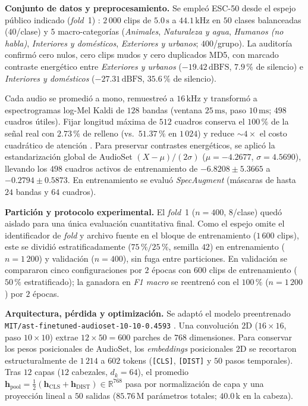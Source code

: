 \documentclass[letterpaper, 10 pt, conference]{ieeeconf}
\begin{document}
\textbf{Conjunto de datos y preprocesamiento.}
Se empleó ESC-50 \cite{c1} desde el espejo público indicado (\textit{fold}~1) \cite{c6}: $2\,000$ clips de $5.0\,\text{s}$ a $44.1\,\text{kHz}$ en $50$ clases balanceadas ($40$/clase) y $5$ macro-categorías (\textit{Animales}, \textit{Naturaleza y agua}, \textit{Humanos (no habla)}, \textit{Interiores y domésticos}, \textit{Exteriores y urbanos}; $400$/grupo). La auditoría confirmó cero nulos, cero clips mudos y cero duplicados MD5, con marcado contraste energético entre \textit{Exteriores y urbanos} ($-19.42\,\text{dBFS}$, $7.9\,\%$ de silencio) e \textit{Interiores y domésticos} ($-27.31\,\text{dBFS}$, $35.6\,\%$ de silencio).

Cada audio se promedió a mono, remuestreó a $16\,\text{kHz}$ \cite{c5} y transformó a espectrogramas log-Mel Kaldi de $128$ bandas (ventana $25\,\text{ms}$, paso $10\,\text{ms}$; $498$ cuadros útiles). Fijar longitud máxima de $512$ cuadros conserva el $100\,\%$ de la señal real con $2.73\,\%$ de relleno (vs.~$51.37\,\%$ en $1\,024$) y reduce $\sim 4\times$ el costo cuadrático de atención \cite{c2}. Para preservar contrastes energéticos, se aplicó la estandarización global de AudioSet $(X-\mu)/(2\sigma)$ ($\mu=-4.2677$, $\sigma=4.5690$), llevando los $498$ cuadros activos de entrenamiento de $-6.8208 \pm 5.3665$ a $-0.2794 \pm 0.5873$. En entrenamiento se evaluó \textit{SpecAugment} \cite{c7} (máscaras de hasta $24$ bandas y $64$ cuadros).

\textbf{Partición y protocolo experimental.}
El \textit{fold}~1 ($n=400$, $8$/clase) quedó aislado para una única evaluación cuantitativa final. Como el espejo \cite{c6} omite el identificador de \textit{fold} y archivo fuente en el bloque de entrenamiento ($1\,600$ clips), este se dividió estratificadamente ($75\,\%/25\,\%$, semilla $42$) en entrenamiento ($n=1\,200$) y validación ($n=400$), sin fuga entre particiones. En validación se compararon cinco configuraciones por $2$ épocas con $600$ clips de entrenamiento ($50\,\%$ estratificado); la ganadora en \textit{F1 macro} se reentrenó con el $100\,\%$ ($n=1\,200$) por $2$ épocas.

\textbf{Arquitectura, pérdida y optimización.}
Se adaptó el modelo preentrenado \texttt{MIT/ast-finetuned-}\allowbreak\texttt{audioset-10-10-0.4593} \cite{c4, c5}. Una convolución $2\text{D}$ ($16\times 16$, paso $10\times 10$) extrae $12\times 50 = 600$ parches de $768$ dimensiones. Para conservar los pesos posicionales de AudioSet, los \textit{embeddings} posicionales $2\text{D}$ se recortaron estructuralmente de $1\,214$ a $602$ tokens (\texttt{[CLS]}, \texttt{[DIST]} y $50$ pasos temporales). Tras $12$ capas ($12$ cabezales, $d_k=64$), el promedio $\mathbf{h}_{\text{pool}}=\frac{1}{2}(\mathbf{h}_{\text{CLS}}+\mathbf{h}_{\text{DIST}})\in\mathbb{R}^{768}$ pasa por normalización de capa y una proyección lineal a $50$ salidas ($85.76\,\text{M}$ parámetros totales; $40.0\,\text{k}$ en la cabeza).
\end{document}
